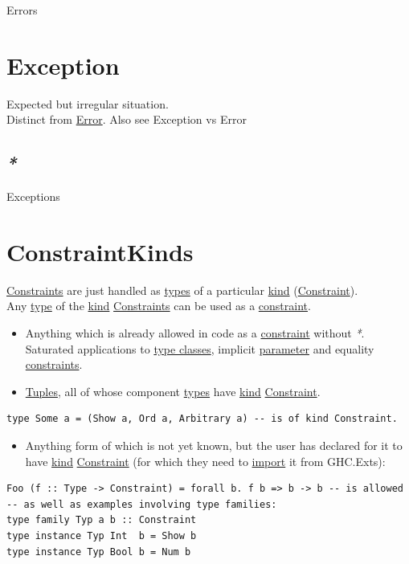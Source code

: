 \documentclass[a4paper,14pt,oneside]{book}
\begin{document}
{\label{org1f41c9c}Errors\\

\chapter{\label{org617291e}Exception}
\label{sec:orgf02a404}
Expected but irregular situation.\\

Distinct from \hyperref[orgb40c72e]{Error}. Also see \label{orge901fd4}Exception vs Error\\

\section{\emph{*}}
\label{sec:orgee685d6}

\label{orgb5f6f11}Exceptions\\

\chapter{\label{orgd428fc2}ConstraintKinds}
\label{sec:org36f918c}
\hyperref[org4e024c9]{Constraints} are just handled as \hyperref[org51532d9]{types} of a particular \hyperref[org3e1a79e]{kind} (\hyperref[org5637118]{Constraint}).\\
Any \hyperref[orga9ca243]{type} of the \hyperref[org3e1a79e]{kind} \hyperref[org4e024c9]{Constraints} can be used as a \hyperref[org5637118]{constraint}.\\
\begin{itemize}
\item Anything which is already allowed in code as a \hyperref[org5637118]{constraint} without \emph{*}. Saturated applications to \hyperref[org547d61d]{type classes}, implicit \hyperref[org0db8baa]{parameter} and equality \hyperref[org4e024c9]{constraints}.\\
\item \hyperref[orgabace30]{Tuples}, all of whose component \hyperref[org51532d9]{types} have \hyperref[org3e1a79e]{kind} \hyperref[org5637118]{Constraint}.\\
\end{itemize}
\begin{verbatim}
type Some a = (Show a, Ord a, Arbitrary a) -- is of kind Constraint.
\end{verbatim}
\begin{itemize}
\item Anything form of which is not yet known, but the user has declared for it to have \hyperref[org3e1a79e]{kind} \hyperref[org5637118]{Constraint} (for which they need to \hyperref[org7dc0f80]{import} it from GHC.Exts):\\
\end{itemize}
\begin{verbatim}
Foo (f :: Type -> Constraint) = forall b. f b => b -> b -- is allowed
-- as well as examples involving type families:
type family Typ a b :: Constraint
type instance Typ Int  b = Show b
type instance Typ Bool b = Num b


\end{verbatim}}
\end{document}
